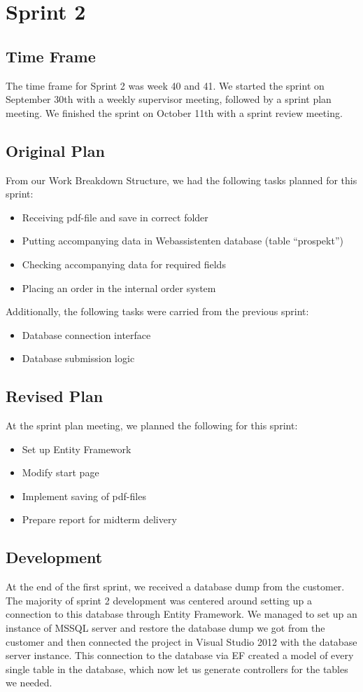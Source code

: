 \section{Sprint 2}

\subsection{Time Frame}
The time frame for Sprint 2 was week 40 and 41. We started the sprint on September 30th with a weekly supervisor meeting, followed by a sprint plan meeting. We finished the sprint on October 11th with a sprint review meeting.

\subsection{Original Plan}
From our Work Breakdown Structure, we had the following tasks planned for this sprint:
\begin{itemize}
	\item Receiving pdf-file and save in correct folder
	\item Putting accompanying data in Webassistenten database (table “prospekt”)
	\item Checking accompanying data for required fields
	\item Placing an order in the internal order system
\end{itemize}

Additionally, the following tasks were carried from the previous sprint:
\begin{itemize}
	\item Database connection interface
	\item Database submission logic
\end{itemize}

\subsection{Revised Plan}
At the sprint plan meeting, we planned the following for this sprint:
\begin{itemize}
	\item Set up Entity Framework
	\item Modify start page
	\item Implement saving of pdf-files
	\item Prepare report for midterm delivery
\end{itemize}

\subsection{Development}
At the end of the first sprint, we received a database dump from the customer. The majority of sprint 2 development was centered around setting up a connection to this database through Entity Framework.
We managed to set up an instance of MSSQL server and restore the database dump we got from the customer and then connected the project in Visual Studio 2012 with the database server instance. This connection to the database via EF created a model of every single table in the database, which now let us generate controllers for the tables we needed.

